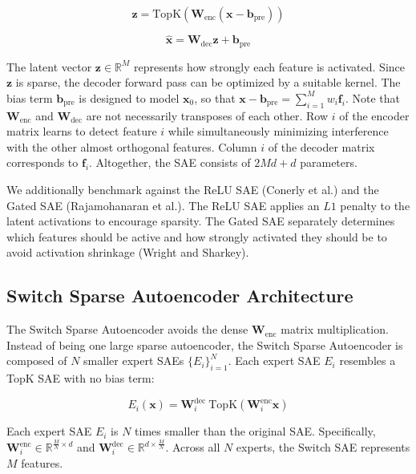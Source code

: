\documentclass{article} %
\begin{document}
\begin{equation}
\mathbf{z} = \text{TopK}(\mathbf{W}_{\text{enc}} (\mathbf{x} - \mathbf{b}_{\text{pre}}))
\end{equation}

\begin{equation}
\hat{\mathbf{x}} = \mathbf{W}_{\text{dec}} \mathbf{z} + \mathbf{b}_{\text{pre}}
\end{equation}

The latent vector \( \mathbf{z} \in \mathbb{R}^M \) represents how strongly each feature is activated. Since \( \mathbf{z} \) is sparse, the decoder forward pass can be optimized by a suitable kernel. The bias term \( \mathbf{b}_{\text{pre}} \) is designed to model \( \mathbf{x}_0 \), so that \( \mathbf{x} - \mathbf{b}_{\text{pre}} = \sum_{i=1}^{M} w_i \mathbf{f}_i \). Note that \( \mathbf{W}_{\text{enc}} \) and \( \mathbf{W}_{\text{dec}} \) are not necessarily transposes of each other. Row \( i \) of the encoder matrix learns to detect feature \( i \) while simultaneously minimizing interference with the other almost orthogonal features. Column \( i \) of the decoder matrix corresponds to \( \mathbf{f}_i \). Altogether, the SAE consists of \( 2Md + d \) parameters.

We additionally benchmark against the ReLU SAE (Conerly et al.) and the Gated SAE (Rajamohanaran et al.). The ReLU SAE applies an \( L1 \) penalty to the latent activations to encourage sparsity. The Gated SAE separately determines which features should be active and how strongly activated they should be to avoid activation shrinkage (Wright and Sharkey).

\subsection{Switch Sparse Autoencoder Architecture}

The Switch Sparse Autoencoder avoids the dense \( \mathbf{W}_{\text{enc}} \) matrix multiplication. Instead of being one large sparse autoencoder, the Switch Sparse Autoencoder is composed of \( N \) smaller expert SAEs \( \{E_i\}_{i=1}^{N} \). Each expert SAE \( E_i \) resembles a TopK SAE with no bias term:

\begin{equation}
E_i(\mathbf{x}) = \mathbf{W}_i^{\text{dec}} \ \text{TopK}(\mathbf{W}_i^{\text{enc}} \mathbf{x})
\end{equation}

Each expert SAE \( E_i \) is \( N \) times smaller than the original SAE. Specifically, \( \mathbf{W}_i^{\text{enc}} \in \mathbb{R}^{\frac{M}{N} \times d} \) and \( \mathbf{W}_i^{\text{dec}} \in \mathbb{R}^{d \times \frac{M}{N}} \). Across all \( N \) experts, the Switch SAE represents \( M \) features.
\end{document}

